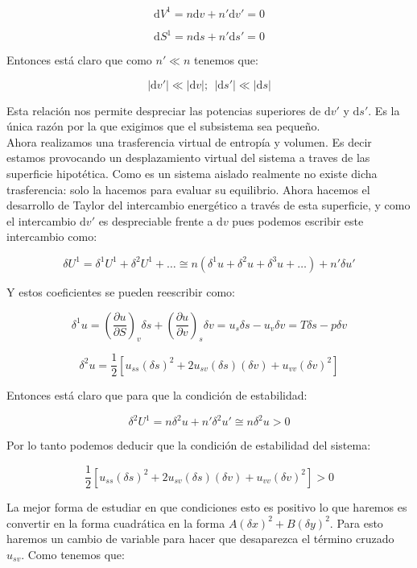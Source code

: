 \documentclass[12pt,a4paper]{article}
\newcommand{\D}{\mathrm{d}}
\newcommand{\parentesis}[1]{\left( #1 \right)}
\newcommand{\parciales}[2]{\frac{\partial #1}{\partial #2}}
\begin{document}
$$ \D V^1 = n \D v + n' \D v' = 0 $$

$$ \D S^1 = n \D s + n' \D s' = 0 $$

Entonces está claro que como $n' \ll n$ tenemos que: 

$$ |\D v'| \ll |\D v|; \ \ |\D s'| \ll |\D s| $$

Esta relación nos permite despreciar las potencias superiores de $\D v'$ y $\D s'$. Es la única razón por la que exigimos que el subsistema sea pequeño. \\

Ahora realizamos una trasferencia virtual de entropía y volumen. Es decir estamos provocando un desplazamiento virtual del sistema a traves de las superficie hipotética. Como es un sistema aislado realmente no existe dicha trasferencia: solo la hacemos para evaluar su equilibrio. Ahora hacemos el desarrollo de Taylor del intercambio energético a través de esta superficie, y como el intercambio $\D v'$ es despreciable frente a $\D v$ pues podemos escribir este intercambio como:

$$ \delta U^1 = \delta^1 U^1 + \delta^2 U^1 + \ldots \cong n(\delta^1 u + \delta^2 u + \delta^3 u + \ldots) + n' \delta u' $$

Y estos coeficientes se pueden reescribir como:

\begin{equation}
\delta^1 u = \parentesis{\parciales{u}{S}}_{v} \delta s + \parentesis{\parciales{u}{v}}_{s} \delta v  = u_s \delta s - u_v \delta v = T \delta s -p \delta v
\end{equation}

\begin{equation}
\delta^2 u = \dfrac{1}{2} [u_{ss} (\delta s)^2 + 2 u_{sv} (\delta s)(\delta v) + u_{vv} (\delta v)^2] 
\end{equation}

Entonces está claro que para que la condición de estabilidad:

$$ \delta^2 U^1 = n \delta^2 u + n' \delta^2 u' \cong n \delta^2 u > 0 $$

Por lo tanto podemos deducir que la condición de estabilidad del sistema:

\begin{equation}
 \dfrac{1}{2} [u_{ss} (\delta s)^2 + 2 u_{sv} (\delta s)(\delta v) + u_{vv} (\delta v)^2] > 0
\end{equation}

La mejor forma de estudiar en que condiciones esto es positivo lo que haremos es convertir en la forma cuadrática en la forma $A(\delta x)^2 + B (\delta y)^2$. Para esto haremos un cambio de variable para hacer que desaparezca el término cruzado $u_{sv}$. Como tenemos que:
\end{document}
